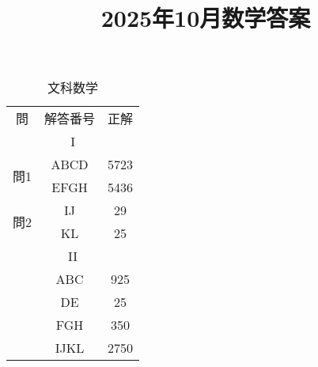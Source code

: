 \documentclass{jsarticle}
\title{\textbf{2025年10月数学答案}}
\date{}
\begin{document}
\maketitle
\begin{CJK}{UTF8}{min}

\begin{table}[htbp]
\centering
\renewcommand{\arraystretch}{1.1}
\begin{minipage}[t]{0.48\textwidth}
\centering
\caption*{文科数学}
\begin{tabular}{|c|c|c|}
\hline
\multirow{2}{*}{問} & \multirow{2}{*}{解答番号} & \multirow{2}{*}{正解} \\
 &  & \\
\hline
\multicolumn{3}{|c|}{I} \\
\hline
\multirow{2}{*}{問1} 
 & \textsf{ABCD} & 5723 \\
 & \textsf{EFGH} & 5436\\
 

\hline
\multirow{2}{*}{問2} 
 & \textsf{IJ} & 29 \\
 & \textsf{KL} & 25 \\

\hline
\multicolumn{3}{|c|}{II} \\
\hline
 & \textsf{ABC} & 925 \\
 & \textsf{DE} & 25\\
 & \textsf{FGH} & 350\\
 & \textsf{IJKL} & 2750 \\


\end{tabular}
\end{minipage}
\end{table}
\end{CJK}
\end{document}
